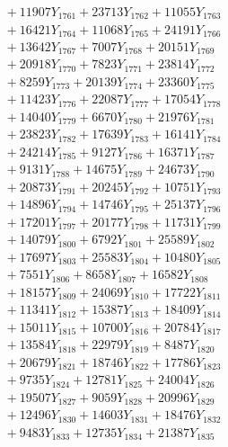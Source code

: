 \documentclass[a4paper,10pt]{article}
\begin{document}
{\begin{align}
&\;  + 11907 Y_{1761} + 23713 Y_{1762} + 11055 Y_{1763} \\[0.3ex]
&\;  + 16421 Y_{1764} + 11068 Y_{1765} + 24191 Y_{1766} \\[0.3ex]
&\;  + 13642 Y_{1767} + 7007 Y_{1768} + 20151 Y_{1769} \\[0.5ex]\allowbreak
&\;  + 20918 Y_{1770} + 7823 Y_{1771} + 23814 Y_{1772} \\[0.3ex]
&\;  + 8259 Y_{1773} + 20139 Y_{1774} + 23360 Y_{1775} \\[0.3ex]
&\;  + 11423 Y_{1776} + 22087 Y_{1777} + 17054 Y_{1778} \\[0.3ex]
&\;  + 14040 Y_{1779} + 6670 Y_{1780} + 21976 Y_{1781} \\[0.3ex]
&\;  + 23823 Y_{1782} + 17639 Y_{1783} + 16141 Y_{1784} \\[0.3ex]
&\;  + 24214 Y_{1785} + 9127 Y_{1786} + 16371 Y_{1787} \\[0.3ex]
&\;  + 9131 Y_{1788} + 14675 Y_{1789} + 24673 Y_{1790} \\[0.3ex]
&\;  + 20873 Y_{1791} + 20245 Y_{1792} + 10751 Y_{1793} \\[0.3ex]
&\;  + 14896 Y_{1794} + 14746 Y_{1795} + 25137 Y_{1796} \\[0.3ex]
&\;  + 17201 Y_{1797} + 20177 Y_{1798} + 11731 Y_{1799} \\[0.5ex]\allowbreak
&\;  + 14079 Y_{1800} + 6792 Y_{1801} + 25589 Y_{1802} \\[0.3ex]
&\;  + 17697 Y_{1803} + 25583 Y_{1804} + 10480 Y_{1805} \\[0.3ex]
&\;  + 7551 Y_{1806} + 8658 Y_{1807} + 16582 Y_{1808} \\[0.3ex]
&\;  + 18157 Y_{1809} + 24069 Y_{1810} + 17722 Y_{1811} \\[0.3ex]
&\;  + 11341 Y_{1812} + 15387 Y_{1813} + 18409 Y_{1814} \\[0.3ex]
&\;  + 15011 Y_{1815} + 10700 Y_{1816} + 20784 Y_{1817} \\[0.3ex]
&\;  + 13584 Y_{1818} + 22979 Y_{1819} + 8487 Y_{1820} \\[0.3ex]
&\;  + 20679 Y_{1821} + 18746 Y_{1822} + 17786 Y_{1823} \\[0.3ex]
&\;  + 9735 Y_{1824} + 12781 Y_{1825} + 24004 Y_{1826} \\[0.3ex]
&\;  + 19507 Y_{1827} + 9059 Y_{1828} + 20996 Y_{1829} \\[0.5ex]\allowbreak
&\;  + 12496 Y_{1830} + 14603 Y_{1831} + 18476 Y_{1832} \\[0.3ex]
&\;  + 9483 Y_{1833} + 12735 Y_{1834} + 21387 Y_{1835} \\[0.3ex]

\end{align}}
\end{document}
